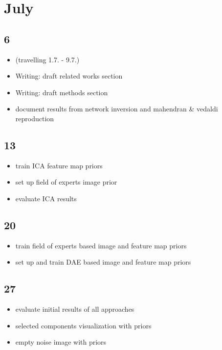 \documentclass{article}
\begin{document}
\section*{July}

\subsection*{6}

\begin{itemize}
	\item (travelling 1.7. - 9.7.)
	\item Writing: draft related works section
	\item Writing: draft methods section
	\item document results from network inversion and mahendran \& vedaldi reproduction
\end{itemize}

\subsection*{13}

\begin{itemize}
	\item train ICA feature map priors
	\item set up field of experts image prior
	\item evaluate ICA results
\end{itemize}

\subsection*{20}

\begin{itemize}
	\item train field of experts based image and feature map priors
	\item set up and train DAE based image and feature map priors
\end{itemize}

\subsection*{27}

\begin{itemize}
	\item evaluate initial results of all approaches
	\item selected components visualization with priors
	\item empty noise image with priors
\end{itemize}
\end{document}
